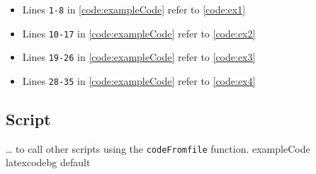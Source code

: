 \documentclass[../Dissertation]{subfiles}
\begin{document}
    \begin{itemize}
        \item Lines \texttt{1-8} in \cref{code:exampleCode} refer to
            \cref{code:ex1}
        \item Lines \texttt{10-17} in \cref{code:exampleCode} refer to
            \cref{code:ex2}
        \item Lines \texttt{19-26} in \cref{code:exampleCode} refer to
            \cref{code:ex3}
        \item Lines \texttt{28-35} in \cref{code:exampleCode} refer to
            \cref{code:ex4}
    \end{itemize}


\subsection{ Script}
    {}
    {\ldots {} to call other scripts using the
     \texttt{codeFromfile} function.} %
    {exampleCode}
    {\footnotesize}
    {latexcodebg}
    {default}

    \clearpage
    \thispagestyle{empty}
\end{document}
